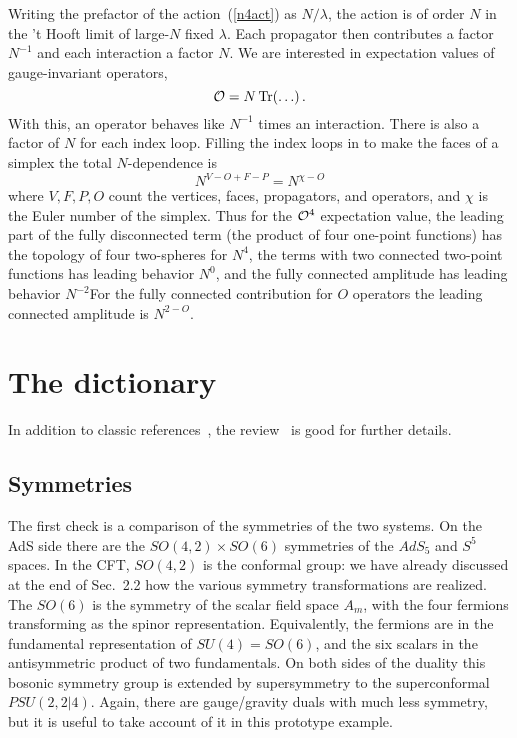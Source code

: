 \documentclass[12pt]{article}
\newcommand{\sect}[1]{\section{#1}\setcounter{equation}{0}}
\begin{document}
{Writing the prefactor of the action~(\ref{n4act}) as $N/\lambda$, the action is of order $N$ in the 't Hooft limit of large-$N$ fixed $\lambda$.  Each propagator then contributes a factor $N^{-1}$ and each interaction a factor $N$.  We are interested in expectation values of gauge-invariant operators,
\begin{equation}
{\cal O} = N\, {\rm Tr}(\ldots) \,.
\end{equation}
With this, an operator behaves like $N^{-1}$ times an interaction.  There is also a factor of $N$ for each index loop.  Filling the index loops in to make the faces of a simplex the total $N$-dependence is
\begin{equation}
N^{V - O +F-P} = N^{\chi-O}
\end{equation}
where $V,F,P,O$ count the vertices, faces, propagators, and operators, and $\chi$ is the Euler number of the simplex.  Thus for the ${\cal O}^4$ expectation value, the leading part of the fully disconnected term (the product of four one-point functions) has the topology of four two-spheres for $N^4$, the terms with two connected two-point functions has leading behavior $N^0$, and the fully connected amplitude has leading behavior $N^{-2}$For the fully connected contribution for $O$ operators the leading connected amplitude is $N^{2-O}$.

\sect{The dictionary}

In addition to classic references~\cite{GKP,W}, the review~\cite{D'Hoker:2002aw} is good for further details.  

\subsection{Symmetries}

The first check is a comparison of the symmetries of the two systems.  On the AdS side there are the $SO(4,2) \times SO(6)$ symmetries of the $AdS_5$ and $S^5$ spaces.  In the CFT, $SO(4,2)$ is the conformal group: we have already discussed at the end of Sec.~2.2 how the various symmetry transformations are realized.  The $SO(6)$ is the symmetry of the scalar field space $A_m$, with the four fermions transforming as the spinor representation.  Equivalently, the fermions are in the fundamental representation of $SU(4) = SO(6)$, and the six scalars in the antisymmetric product of two fundamentals.  On both sides of the duality this bosonic symmetry group is extended by supersymmetry to the superconformal $PSU(2, 2|4)$.  Again, there are gauge/gravity duals with much less symmetry, but it is useful to take account of it in this prototype example.

}
\end{document}
